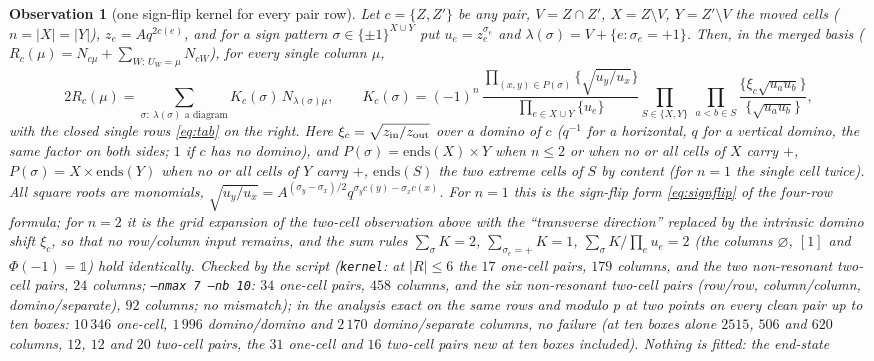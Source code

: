 \documentclass[11pt]{article}
\newtheorem{observation}{Observation}
\newcommand{\vac}{\varnothing}
\newcommand{\one}{\mathbb 1}
\newcommand{\LMPH}[1]{\texttt{#1}}
\begin{document}
\begin{observation}[one sign-flip kernel for every pair row]\label{obs:kernel}
Let $c=\{Z,Z'\}$ be any pair, $V=Z\cap Z'$, $X=Z\setminus V$, $Y=Z'\setminus V$ the moved cells ($n=|X|=|Y|$), $z_e=Aq^{2c(e)}$,
and for a sign pattern $\sigma\in\{\pm1\}^{X\cup Y}$ put $u_e=z_e^{\sigma_e}$ and $\lambda(\sigma)=V+\{e:\sigma_e=+1\}$.
Then, in the merged basis ($R_c(\mu)=N_{c\mu}+\sum_{W:\,U_W=\mu}N_{cW}$), for every single column $\mu$,
\begin{equation}\label{eq:kernel}
2R_c(\mu)=\sum_{\sigma:\ \lambda(\sigma)\text{ a diagram}}K_c(\sigma)\,N_{\lambda(\sigma)\mu},\qquad
K_c(\sigma)=(-1)^n\,\frac{\prod_{(x,y)\in P(\sigma)}\{\sqrt{u_y/u_x}\}}{\prod_{e\in X\cup Y}\{u_e\}}
\prod_{S\in\{X,Y\}}\ \prod_{a<b\in S}\frac{\{\xi_c\sqrt{u_au_b}\}}{\{\sqrt{u_au_b}\}},
\end{equation}
with the closed single rows \eqref{eq:tab} on the right.  Here $\xi_c=\sqrt{z_{\rm in}/z_{\rm out}}$ over a domino of
$c$ ($q^{-1}$ for a horizontal, $q$ for a vertical domino, the same factor on both sides; $1$ if $c$ has no domino),
and $P(\sigma)=\mathrm{ends}(X)\times Y$ when $n\le2$ or when no or all cells of $X$ carry $+$, $P(\sigma)=X\times
\mathrm{ends}(Y)$ when no or all cells of $Y$ carry $+$, $\mathrm{ends}(S)$ the two extreme cells of $S$ by content
(for $n=1$ the single cell twice).  All square roots are monomials, $\sqrt{u_y/u_x}=A^{(\sigma_y-\sigma_x)/2}
q^{\sigma_yc(y)-\sigma_xc(x)}$.  For $n=1$ this is the sign-flip form \eqref{eq:signflip} of the four-row formula; for
$n=2$ it is the grid expansion of the two-cell observation above with the ``transverse direction'' replaced by the
intrinsic domino shift $\xi_c$, so that no row/column input remains, and the sum rules $\sum_\sigma K=2$,
$\sum_{\sigma_e=+}K=1$, $\sum_\sigma K/\prod_eu_e=2$ (the columns $\vac$, $[1]$ and $\Phi(-1)=\one$) hold identically.
Checked by the script (\LMPH{kernel}: at $|R|\le6$ the $17$ one-cell pairs, $179$ columns, and the two non-resonant
two-cell pairs, $24$ columns; \LMPH{--nmax 7 --nb 10}: $34$ one-cell pairs, $458$ columns, and the six non-resonant
two-cell pairs (row/row, column/column, domino/separate), $92$ columns; no mismatch); in the analysis exact on the same
rows and modulo $p$ at two points on every clean pair up to ten boxes: $10\,346$ one-cell, $1\,996$ domino/domino and
$2\,170$ domino/separate columns, no failure (at ten boxes alone $2515$, $506$ and $620$ columns, $12$, $12$ and $20$
two-cell pairs, the $31$ one-cell and $16$ two-cell pairs new at ten boxes included).  Nothing is fitted: the end-state

\end{observation}
\end{document}
